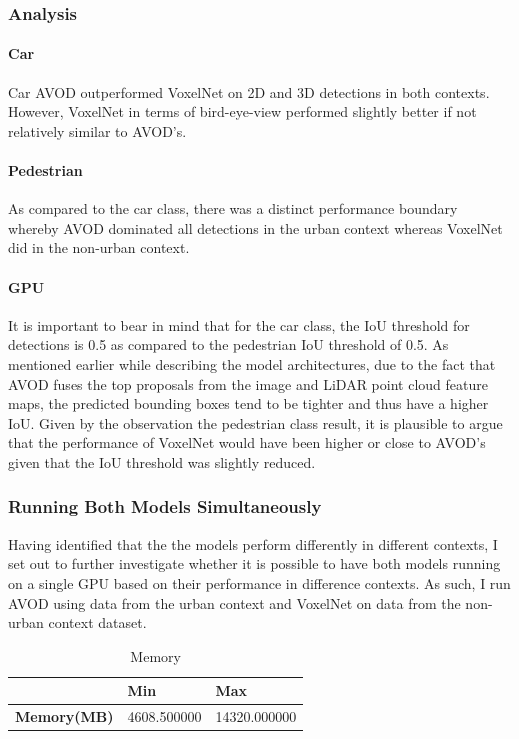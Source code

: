 \subsubsection*{Analysis}
\paragraph{Car}Car AVOD outperformed VoxelNet on 2D and 3D detections in both contexts. However, VoxelNet in terms of bird-eye-view performed slightly better if not relatively similar to AVOD's. 
\paragraph{Pedestrian} As compared to the car class, there was a distinct performance boundary whereby AVOD dominated all detections in the urban context whereas VoxelNet did in the non-urban context.
\paragraph{GPU} 

It is important to bear in mind that for the car class, the IoU threshold for detections is 0.5 as compared to the pedestrian IoU threshold of 0.5. As mentioned earlier while describing the model architectures, due to the fact that AVOD fuses the top proposals from the image and LiDAR point cloud feature maps, the predicted bounding boxes tend to be tighter and thus have a higher IoU. Given by the observation the pedestrian class result, it is plausible to argue that the performance of VoxelNet would have been higher or close to AVOD's given that the IoU threshold was slightly reduced.


\subsubsection*{Running Both Models Simultaneously}
Having identified that the the models perform differently in different contexts, I set out to further investigate whether it is possible to have both models running on a single GPU based on their performance in difference contexts. As such, I run AVOD using data from the urban context and VoxelNet on data from the non-urban context dataset.


\begin{table}[H] %
	\centering
	\caption{Memory}
	\label{tab:mem}
	\begin{tabular}{|l|l|l|}
		\hline
		& \textbf{Min} & \textbf{Max} \\ \hline
		\textbf{Memory(MB)} & 4608.500000  & 14320.000000 \\ \hline
	\end{tabular}
	
\end{table}


